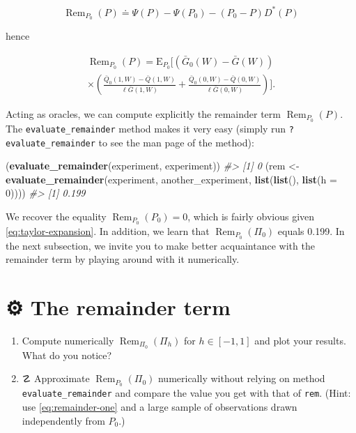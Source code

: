 \documentclass[11pt,openright,twoside]{book}
\newenvironment{Shaded}{\begin{snugshade}}{\end{snugshade}}
\newcommand{\CommentTok}[1]{\textcolor[rgb]{0.56,0.35,0.01}{\textit{#1}}}
\newcommand{\DataTypeTok}[1]{\textcolor[rgb]{0.13,0.29,0.53}{#1}}
\newcommand{\DecValTok}[1]{\textcolor[rgb]{0.00,0.00,0.81}{#1}}
\newcommand{\KeywordTok}[1]{\textcolor[rgb]{0.13,0.29,0.53}{\textbf{#1}}}
\newcommand{\NormalTok}[1]{#1}
\newcommand{\StringTok}[1]{\textcolor[rgb]{0.31,0.60,0.02}{#1}}
\DeclareMathOperator{\Rem}{Rem}
\newcommand{\gear}{\usebox{\gearbox}\;}
\DeclareRobustCommand{\stixdanger}{%
  {\usefont{U}{stixbbit}{m}{it}\symbol{"F6}}%
}
\newcommand{\defq}{\doteq}
\newcommand{\Exp}{\textrm{E}}
\newcommand{\Gbar}{\bar{G}}
\newcommand{\Qbar}{\bar{Q}}
\theoremstyle{definition}
\theoremstyle{definition}
\theoremstyle{definition}
\theoremstyle{remark}
\begin{document}
\begin{equation}
\Rem_{P_0}(P)    \defq   \Psi(P)    -   \Psi(P_0)    -   (P_0    -   P)D^*(P)
\label{eq:remainder-one}
\end{equation}

hence

\begin{multline} 
\Rem_{P_0}(P)=   \Exp_{P_0}   \Bigg[   \left(\Gbar_0(W)   -
\Gbar(W)\right) \\          \times          \left(\frac{\Qbar_0(1,W)           -
\Qbar(1,W)}{\ell\Gbar(1,W)} + \frac{\Qbar_0(0,W) - \Qbar(0,W)}{\ell\Gbar(0,W)}
\right) \Bigg]. \label{eq:remainder} 
\end{multline}

Acting as oracles, we can compute explicitly the remainder term
\(\Rem_{P_0}(P)\). The \texttt{evaluate\_remainder} method makes it very easy (simply
run \texttt{?evaluate\_remainder} to see the man page of the method):

\begin{Shaded}
\begin{Highlighting}[]
\NormalTok{(}\KeywordTok{evaluate_remainder}\NormalTok{(experiment, experiment))}
\CommentTok{#> [1] 0}
\NormalTok{(rem <-}\StringTok{ }\KeywordTok{evaluate_remainder}\NormalTok{(experiment, another_experiment,}
                           \KeywordTok{list}\NormalTok{(}\KeywordTok{list}\NormalTok{(), }\KeywordTok{list}\NormalTok{(}\DataTypeTok{h =} \DecValTok{0}\NormalTok{))))}
\CommentTok{#> [1] 0.199}
\end{Highlighting}
\end{Shaded}

We recover the equality \(\Rem_{P_{0}} (P_{0}) = 0\), which is fairly obvious
given \eqref{eq:taylor-expansion}. In addition, we learn that \(\Rem_{P_{0}} (\Pi_{0})\) equals 0.199. In the next subsection, we invite you to
make better acquaintance with the remainder term by playing around with it
numerically.

\hypertarget{exo-remainder-term}{%
\section{\texorpdfstring{⚙ \gear The remainder term}{⚙ The remainder term}}\label{exo-remainder-term}}

\begin{enumerate}
\def\labelenumi{\arabic{enumi}.}
\item
  Compute numerically \(\Rem_{\Pi_0}(\Pi_h)\) for \(h \in [-1,1]\) and plot your
  results. What do you notice?
\item
  ☡ \stixdanger{} Approximate \(\Rem_{P_{0}} (\Pi_{0})\) numerically
  without relying on method \texttt{evaluate\_remainder} and compare the value you get
  with that of \texttt{rem}. (Hint: use \eqref{eq:remainder-one} and a large sample of
  observations drawn independently from \(P_{0}\).)
\end{enumerate}
\end{document}
